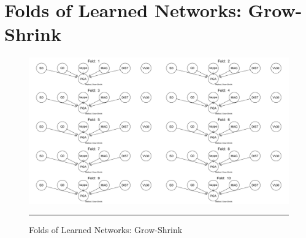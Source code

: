 \newpage
\section{Folds of Learned Networks: Grow-Shrink} %

\label{AppendixC} %

\begin{figure}[!htbp]%
	\centering
		\includegraphics[angle=90,scale=0.5]{Figures/gs.pdf}
		\rule{35em}{0.5pt}
	\caption*{Folds of Learned Networks: Grow-Shrink}
\end{figure}